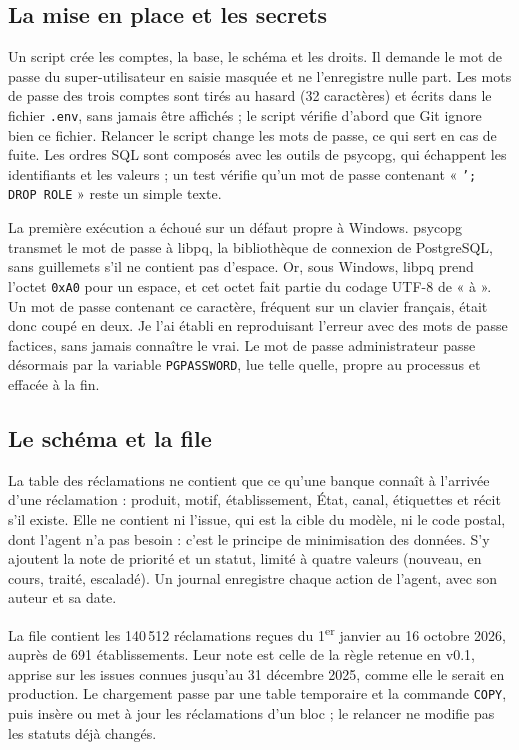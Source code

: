 \documentclass[11pt,a4paper]{article}
\begin{document}
\subsection{La mise en place et les secrets}

Un script crée les comptes, la base, le schéma et les droits. Il demande le mot de passe du super-utilisateur en saisie masquée et ne l'enregistre nulle part. Les mots de passe des trois comptes sont tirés au hasard (32 caractères) et écrits dans le fichier \texttt{.env}, sans jamais être affichés ; le script vérifie d'abord que Git ignore bien ce fichier. Relancer le script change les mots de passe, ce qui sert en cas de fuite. Les ordres SQL sont composés avec les outils de psycopg, qui échappent les identifiants et les valeurs ; un test vérifie qu'un mot de passe contenant « \texttt{'; DROP ROLE} » reste un simple texte.

La première exécution a échoué sur un défaut propre à Windows. psycopg transmet le mot de passe à libpq, la bibliothèque de connexion de PostgreSQL, sans guillemets s'il ne contient pas d'espace. Or, sous Windows, libpq prend l'octet \texttt{0xA0} pour un espace, et cet octet fait partie du codage UTF-8 de « à ». Un mot de passe contenant ce caractère, fréquent sur un clavier français, était donc coupé en deux. Je l'ai établi en reproduisant l'erreur avec des mots de passe factices, sans jamais connaître le vrai. Le mot de passe administrateur passe désormais par la variable \texttt{PGPASSWORD}, lue telle quelle, propre au processus et effacée à la fin.

\subsection{Le schéma et la file}

La table des réclamations ne contient que ce qu'une banque connaît à l'arrivée d'une réclamation : produit, motif, établissement, État, canal, étiquettes et récit s'il existe. Elle ne contient ni l'issue, qui est la cible du modèle, ni le code postal, dont l'agent n'a pas besoin : c'est le principe de minimisation des données. S'y ajoutent la note de priorité et un statut, limité à quatre valeurs (nouveau, en cours, traité, escaladé). Un journal enregistre chaque action de l'agent, avec son auteur et sa date.

La file contient les 140\,512 réclamations reçues du 1\textsuperscript{er} janvier au 16 octobre 2026, auprès de 691 établissements. Leur note est celle de la règle retenue en v0.1, apprise sur les issues connues jusqu'au 31 décembre 2025, comme elle le serait en production. Le chargement passe par une table temporaire et la commande \texttt{COPY}, puis insère ou met à jour les réclamations d'un bloc ; le relancer ne modifie pas les statuts déjà changés.
\end{document}
